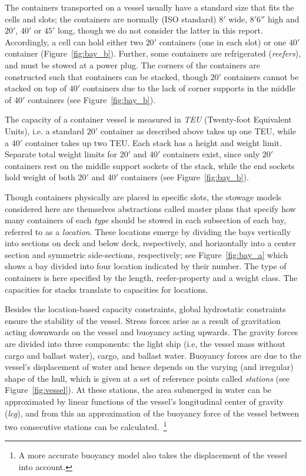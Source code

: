 The containers transported on a vessel usually have a standard size that fits the cells and slots; the containers are normally (ISO standard) $8'$ wide, $8'6''$ high and $20'$,
$40'$ or $45'$ long, though we do not consider the latter in this report. Accordingly, a cell can hold either two $20'$ containers (one in each slot) or one $40'$ container (Figure~\ref{fig:bay_b}). Further, some containers are refrigerated (\emph{reefers}), and must be stowed at a power plug. 
The corners of the containers are constructed such that containers can be stacked, though $20'$ containers cannot
be stacked on top of $40'$ containers due to the lack of corner supports in the middle of $40'$ containers (see Figure~\ref{fig:bay_b}). 

The capacity of a container vessel is measured in \emph{TEU} (Twenty-foot Equivalent Units), i.e. a standard $20'$ container as described above takes up one TEU, while a $40'$ container takes up two TEU. Each stack has a height and weight limit. Separate total weight limits for $20'$ and $40'$ containers exist, since only $20'$ containers rest on the middle support sockets of the stack, while the end sockets hold weight of both $20'$ and $40'$ containers (see Figure~\ref{fig:bay_b}). 

Though containers physically are placed in specific slots, the stowage models considered here are themselves abstractions called master plans that specify how many containers of each \emph{type} should be stowed in each subsection of each bay, referred to as a {\em location}. These locations emerge by dividing the bays {vertically} into sections on deck and below deck, respectively, and {horizontally} into a center section and symmetric side-sections, respectively; see Figure~\ref{fig:bay_a} which shows a bay divided into four location indicated by their number. The type of containers is here specified by the length, reefer-property and a weight class. The capacities for stacks translate to capacities for locations.

Besides the location-based capacity constraints, global hydrostatic constraints ensure the stability of the vessel. Stress forces arise as a result of gravitation acting downwards on the vessel and buoyancy acting upwards. The gravity forces are divided into three components: the light ship (i.e, the vessel mass without cargo and ballast water), cargo, and ballast water. Buoyancy forces are due to the vessel's displacement of water and hence depends on the varying (and irregular) shape of the hull, which is given at a set of reference points called \emph{stations} (see Figure~\ref{fig:vessel}). At these stations, the area submerged in water can be approximated by linear functions of the vessel's  longitudinal center of gravity (\emph{lcg}), and from this an approximation of the buoyancy force of the vessel between two consecutive stations can be calculated.~\footnote{A more accurate buoyancy model also takes the displacement of the vessel into account.}

